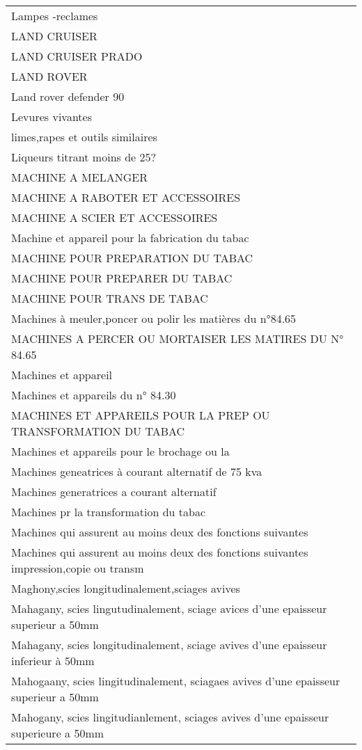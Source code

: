 \documentclass[
]{book}
\begin{document}
\begin{longtable}[t]{l}
\addlinespace
Lampes -reclames\\
LAND CRUISER\\
LAND CRUISER PRADO\\
LAND ROVER\\
Land rover defender 90\\
\addlinespace
Levures vivantes\\
limes,rapes et outils similaires\\
Liqueurs titrant moins de 25?\\
MACHINE A MELANGER\\
MACHINE A RABOTER ET ACCESSOIRES\\
\addlinespace
MACHINE A SCIER ET ACCESSOIRES\\
Machine et appareil pour la fabrication du tabac\\
MACHINE POUR PREPARATION DU TABAC\\
MACHINE POUR PREPARER DU TABAC\\
MACHINE POUR TRANS DE TABAC\\
\addlinespace
Machines à meuler,poncer ou polir les matières du n°84.65\\
MACHINES A PERCER OU MORTAISER LES MATIRES DU N° 84.65\\
Machines et appareil\\
Machines et appareils du n° 84.30\\
MACHINES ET APPAREILS POUR LA PREP OU TRANSFORMATION DU TABAC\\
\addlinespace
Machines et appareils pour le brochage ou la\\
Machines geneatrices à courant alternatif de 75 kva\\
Machines generatrices a courant alternatif\\
Machines pr la transformation du tabac\\
Machines qui assurent au moins deux des fonctions suivantes\\
\addlinespace
Machines qui assurent au moins deux des fonctions suivantes impression,copie ou transm\\
Maghony,scies longitudinalement,sciages avives\\
Mahagany, scies lingutudinalement, sciage avices d'une epaisseur superieur a 50mm\\
Mahagany, scies longitudinalement, sciage avives d'une epaisseur inferieur à 50mm\\
Mahogaany, scies lingitudinalement, sciagaes avives d'une epaisseur superieur a 50mm\\
\addlinespace
Mahogany, scies lingitudianlement, sciages avives d'une epaisseur superieure a 50mm\\

\end{longtable}
\end{document}
